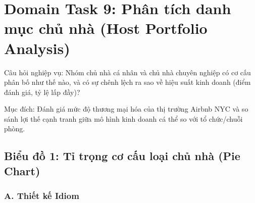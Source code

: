 \section{Domain Task 9: Phân tích danh mục chủ nhà (Host Portfolio Analysis)}

Câu hỏi nghiệp vụ: Nhóm chủ nhà cá nhân và chủ nhà chuyên nghiệp có cơ
cấu phân bố như thế nào, và có sự chênh lệch ra sao về hiệu suất kinh
doanh (điểm đánh giá, tỷ lệ lấp đầy)?

Mục đích: Đánh giá mức độ thương mại hóa của thị trường Airbnb NYC và so
sánh lợi thế cạnh tranh giữa mô hình kinh doanh cá thể so với tổ
chức/chuỗi phòng.

\subsection{Biểu đồ 1: Tỉ trọng cơ cấu loại chủ nhà (Pie Chart)}

\subsubsection*{A. Thiết kế Idiom}

